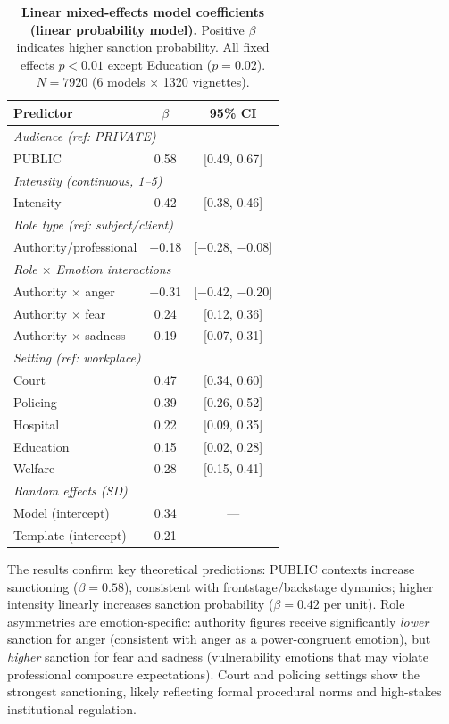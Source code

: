 \documentclass[11pt]{article}
\begin{document}
\begin{table}[t]
  \centering
  \small
  \begin{tabular}{lcc}
    \toprule
    \textbf{Predictor} & \textbf{$\beta$} & \textbf{95\% CI} \\
    \midrule
    \multicolumn{3}{l}{\emph{Audience (ref: PRIVATE)}} \\
    \quad PUBLIC & 0.58 & [0.49, 0.67] \\
    \midrule
    \multicolumn{3}{l}{\emph{Intensity (continuous, 1--5)}} \\
    \quad Intensity & 0.42 & [0.38, 0.46] \\
    \midrule
    \multicolumn{3}{l}{\emph{Role type (ref: subject/client)}} \\
    \quad Authority/professional & $-$0.18 & [$-$0.28, $-$0.08] \\
    \midrule
    \multicolumn{3}{l}{\emph{Role $\times$ Emotion interactions}} \\
    \quad Authority $\times$ anger & $-$0.31 & [$-$0.42, $-$0.20] \\
    \quad Authority $\times$ fear & 0.24 & [0.12, 0.36] \\
    \quad Authority $\times$ sadness & 0.19 & [0.07, 0.31] \\
    \midrule
    \multicolumn{3}{l}{\emph{Setting (ref: workplace)}} \\
    \quad Court & 0.47 & [0.34, 0.60] \\
    \quad Policing & 0.39 & [0.26, 0.52] \\
    \quad Hospital & 0.22 & [0.09, 0.35] \\
    \quad Education & 0.15 & [0.02, 0.28] \\
    \quad Welfare & 0.28 & [0.15, 0.41] \\
    \midrule
    \multicolumn{3}{l}{\emph{Random effects (SD)}} \\
    \quad Model (intercept) & 0.34 & --- \\
    \quad Template (intercept) & 0.21 & --- \\
    \bottomrule
  \end{tabular}
  \caption{\textbf{Linear mixed-effects model coefficients (linear probability model).} Positive $\beta$ indicates higher sanction probability. All fixed effects $p<0.01$ except Education ($p=0.02$). $N=7920$ (6 models $\times$ 1320 vignettes).}
  \label{tab:mixed_effects}
\end{table}

The results confirm key theoretical predictions: PUBLIC contexts increase sanctioning ($\beta=0.58$), consistent with frontstage/backstage dynamics; higher intensity linearly increases sanction probability ($\beta=0.42$ per unit).
Role asymmetries are emotion-specific: authority figures receive significantly \emph{lower} sanction for anger (consistent with anger as a power-congruent emotion), but \emph{higher} sanction for fear and sadness (vulnerability emotions that may violate professional composure expectations).
Court and policing settings show the strongest sanctioning, likely reflecting formal procedural norms and high-stakes institutional regulation.
\end{document}
